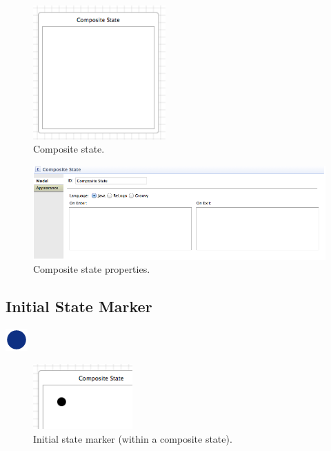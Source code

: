 \documentclass[11pt]{amsart}
\begin{document}
\begin{figure}
\begin{center}
\vspace{.2in}
\centerline {
\includegraphics[width=2in]{StatechartsImages/CompositeState.png}
}
\caption{Composite state.}
\label{fig:compositeState}
\end{center}
\end{figure}

\begin{figure}
\begin{center}
\vspace{.2in}
\centerline {
\includegraphics[width=5in]{StatechartsImages/CompositeStateProperties.png}
}
\caption{Composite state properties.}
\label{fig:compositeStateProperties}
\end{center}
\end{figure}

\clearpage

\subsection{Initial State Marker}
\label{sec:initialStateMarker}
\includegraphics[height=.2in]{StatechartsImages/Initial-State-32.png}

\begin{figure}
\begin{center}
\vspace{.2in}
\centerline {
\includegraphics[width=1.5in]{StatechartsImages/InitialStateMarker.png}
}
\caption{Initial state marker (within a composite state).}
\label{fig:initialStateMarker}
\end{center}
\end{figure}
\end{document}
